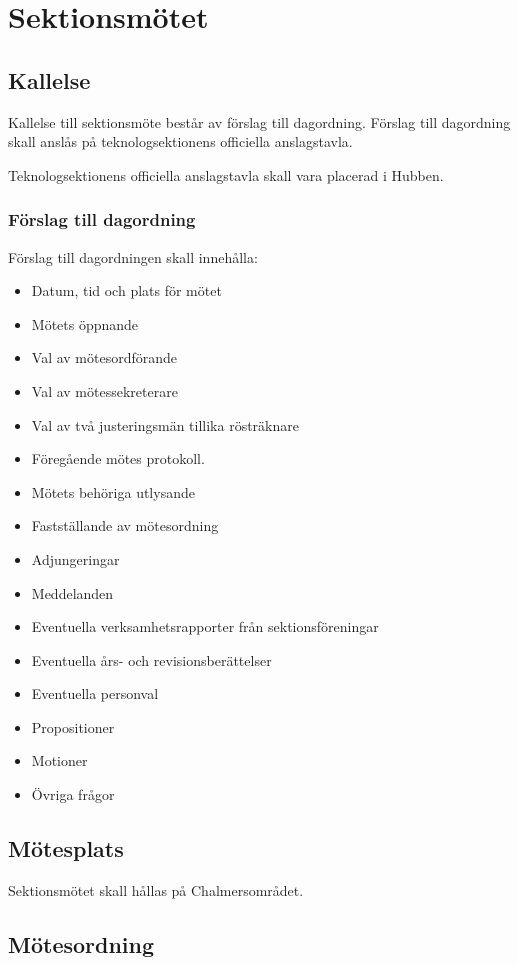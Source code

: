 \section{Sektionsmötet}

\subsection{Kallelse} 
Kallelse till sektionsmöte består av förslag till dagordning. Förslag till dagordning skall anslås på teknologsektionens officiella anslagstavla.

Teknologsektionens officiella anslagstavla skall vara placerad i Hubben. 

\subsubsection{Förslag till dagordning}
Förslag till dagordningen skall innehålla:
\begin{itemize}  
  \item Datum, tid och plats för mötet 
  \item Mötets öppnande 
  \item Val av mötesordförande 
  \item Val av mötessekreterare 
  \item Val av två justeringsmän tillika rösträknare 
  \item Föregående mötes protokoll. 
  \item Mötets behöriga utlysande 
  \item Fastställande av mötesordning 
  \item Adjungeringar 
  \item Meddelanden 
  \item Eventuella verksamhetsrapporter från sektionsföreningar 
  \item Eventuella års- och revisionsberättelser 
  \item Eventuella personval 
  \item Propositioner 
  \item Motioner 
  \item Övriga frågor 
\end{itemize}
\subsection{Mötesplats} 
Sektionsmötet skall hållas på Chalmersområdet. 
\subsection{Mötesordning}
